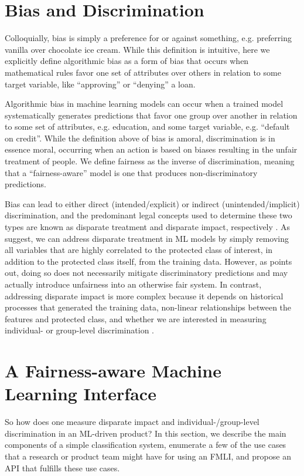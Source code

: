\documentclass{acm_proc_article-sp}
\begin{document}
\section{Bias and Discrimination}
Colloquially, bias is simply a preference for or against something, e.g.
preferring vanilla over chocolate ice cream. While this definition is
intuitive, here we explicitly define algorithmic bias as a form of bias that
occurs when mathematical rules favor one set of attributes over others in
relation to some target variable, like ``approving'' or ``denying'' a loan.

Algorithmic bias in machine learning models can occur when a trained model
systematically generates predictions that favor one group over another in
relation to some set of attributes, e.g. education, and some target variable,
e.g. ``default on credit''. While the definition above of bias is amoral,
discrimination is in essence moral, occurring when an action is based on biases
resulting in the unfair treatment of people. We define fairness as the inverse
of discrimination, meaning that a ``fairness-aware'' model is one that produces
non-discriminatory predictions.

Bias can lead to either direct (intended/explicit) or indirect
(unintended/implicit) discrimination, and the predominant legal concepts used to
determine these two types are known as disparate treatment and disparate impact,
respectively \cite{barocas2016big}. As \cite{kusner2017counterfactual,
kamiran2012data} suggest, we can address disparate treatment in ML models by
simply removing all variables that are highly correlated to the protected class
of interest, in addition to the protected class itself, from the training data.
However, as \cite{kusner2017counterfactual} points out, doing so does not
necessarily mitigate discriminatory predictions and may actually introduce
unfairness into an otherwise fair system. In contrast, addressing disparate
impact is more complex because it depends on historical processes that generated
the training data, non-linear relationships between the features and protected
class, and whether we are interested in measuring individual- or group-level
discrimination \cite{dwork2012fairness}.

\section{A Fairness-aware Machine Learning Interface}

So how does one measure
disparate impact and individual-/group-level discrimination in an ML-driven
product? In this section, we describe the main components of a simple
classification system, enumerate a few of the use cases that a research or
product team might have for using an FMLI, and propose an API that fulfills
these use cases.
\end{document}
